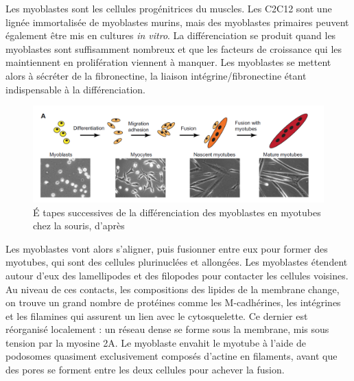Les myoblastes sont les cellules progénitrices du muscles. Les C2C12 sont une lignée immortalisée de myoblastes murins, mais des myoblastes primaires peuvent également être mis en cultures \textit{in vitro}.
La différenciation se produit quand les myoblastes sont suffisamment nombreux et que les facteurs de croissance qui les maintiennent en prolifération viennent à manquer. 
Les myoblastes se mettent alors à sécréter de la fibronectine, la liaison intégrine/fibronectine étant indispensable à la différenciation.
\begin{figure}
\includegraphics[scale=0.4]{Figures/Myoblast_fusion.png} 
\caption{\'E tapes successives de la différenciation des myoblastes en myotubes chez la souris, d'après \cite{Abmayr}}
\end{figure}

Les myoblastes vont alors s'aligner, puis fusionner entre eux pour former des myotubes, qui sont des cellules plurinuclées et allongées. 
Les myoblastes étendent autour d'eux des lamellipodes et des filopodes pour contacter les cellules voisines. Au niveau de ces contacts, les compositions des lipides de la membrane change, on trouve un grand nombre de protéines comme les M-cadhérines, les intégrines et les filamines qui assurent un lien avec le cytosquelette. Ce dernier est réorganisé localement : un réseau dense se forme sous la membrane, mis sous tension par la myosine 2A. 
Le myoblaste envahit le myotube à l'aide de podosomes quasiment exclusivement composés d'actine en filaments, avant que des pores se forment entre les deux cellules pour achever la fusion. 



